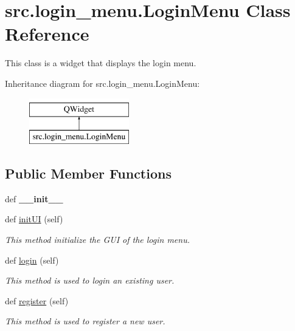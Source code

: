 \hypertarget{classsrc_1_1login__menu_1_1_login_menu}{}\section{src.\+login\+\_\+menu.\+Login\+Menu Class Reference}
\label{classsrc_1_1login__menu_1_1_login_menu}


This class is a widget that displays the login menu.  


Inheritance diagram for src.\+login\+\_\+menu.\+Login\+Menu\+:\begin{figure}[H]
\begin{center}
\leavevmode
\includegraphics[height=2.000000cm]{classsrc_1_1login__menu_1_1_login_menu}
\end{center}
\end{figure}
\subsection*{Public Member Functions}
\begin{DoxyCompactItemize}
\item 
\hypertarget{classsrc_1_1login__menu_1_1_login_menu_a33638b382a7b9e5c95163bae3900d5b3}{}def {\bfseries \+\_\+\+\_\+init\+\_\+\+\_\+}\label{classsrc_1_1login__menu_1_1_login_menu_a33638b382a7b9e5c95163bae3900d5b3}

\item 
def \hyperlink{classsrc_1_1login__menu_1_1_login_menu_a5114077865bfc30e8adef2f90cd27d85}{init\+U\+I} (self)
\begin{DoxyCompactList}\small\item\em This method initialize the G\+U\+I of the login menu. \end{DoxyCompactList}\item 
def \hyperlink{classsrc_1_1login__menu_1_1_login_menu_a75303935e17e43388fd4ef3df029944e}{login} (self)
\begin{DoxyCompactList}\small\item\em This method is used to login an existing user. \end{DoxyCompactList}\item 
def \hyperlink{classsrc_1_1login__menu_1_1_login_menu_af6ee6a8dee90f1a94a506400356707ad}{register} (self)
\begin{DoxyCompactList}\small\item\em This method is used to register a new user. \end{DoxyCompactList}\end{DoxyCompactItemize}
